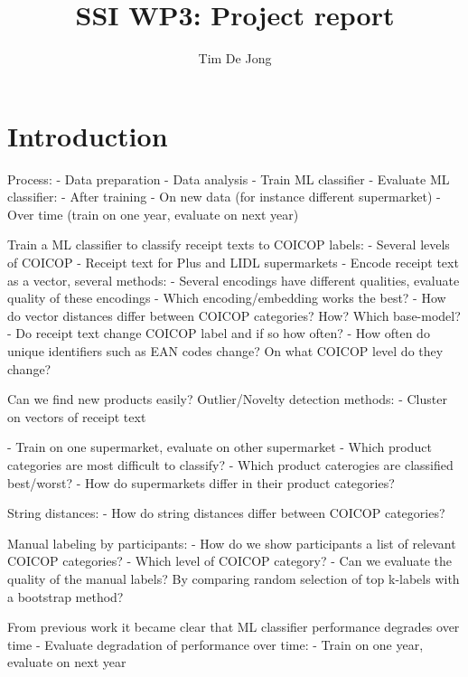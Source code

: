 \documentclass{article}
\title{SSI WP3: Project report}
\author{Tim De Jong}
\begin{document}
\maketitle


\section{Introduction}

Process:
- Data preparation
- Data analysis
- Train ML classifier
- Evaluate ML classifier:
    - After training
    - On new data (for instance different supermarket)
    - Over time (train on one year, evaluate on next year)




Train a ML classifier to classify receipt texts to COICOP labels:
- Several levels of COICOP
- Receipt text for Plus and LIDL supermarkets
- Encode receipt text as a vector, several methods: 
    - Several encodings have different qualities, evaluate quality of these encodings
    - Which encoding/embedding works the best?
    - How do vector distances differ between COICOP categories? How? Which base-model?
- Do receipt text change COICOP label and if so how often?
- How often do unique identifiers such as EAN codes change? On what COICOP level do they change?
    
Can we find new products easily? Outlier/Novelty detection methods:    
    - Cluster on vectors of receipt text

- Train on one supermarket, evaluate on other supermarket
- Which product categories are most difficult to classify?
- Which product caterogies are classified best/worst?
- How do supermarkets differ in their product categories?

String distances:
- How do string distances differ between COICOP categories?

Manual labeling by participants:
- How do we show participants a list of relevant COICOP categories?
- Which level of COICOP category?
- Can we evaluate the quality of the manual labels? By comparing random selection of top k-labels with a 
bootstrap method?

From previous work it became clear that ML classifier performance degrades over time
- Evaluate degradation of performance over time:
    - Train on one year, evaluate on next year
\end{document}
